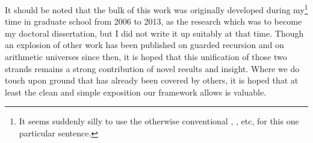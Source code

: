 It should be noted that the bulk of this work was originally developed during my\footnote{It seems suddenly silly to use the otherwise conventional , , etc, for this one particular sentence.} time in graduate school from 2006 to 2013, as the research which was to become my doctoral dissertation, but I did not write it up suitably at that time. Though an explosion of other work has been published on guarded recursion and on arithmetic universes since then, it is hoped that this unification of those two strands remains a strong contribution of novel results and insight. Where we do touch upon ground that has already been covered by others, it is hoped that at least the clean and simple exposition our framework allows is valuable.

\fileend
